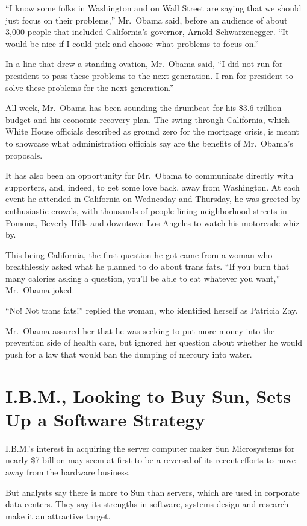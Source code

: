 \documentclass[12pt,a4paper,onecolumn]{article}
\begin{document}
\begin{CJK*}{GBK}{song}
``I know some folks in Washington and on Wall Street are saying that we should just focus on their
problems,'' Mr.~Obama said, before an audience of about 3,000 people that included California's
governor, Arnold Schwarzenegger. ``It would be nice if I could pick and choose what problems to
focus on.''

In a line that drew a standing ovation, Mr.~Obama said, ``I did not run for president to pass these
problems to the next generation. I ran for president to solve these problems for the next
generation.''

All week, Mr.~Obama has been sounding the drumbeat for his \$3.6 trillion budget and his economic
recovery plan. The swing through California, which White House officials described as ground zero
for the mortgage crisis, is meant to showcase what administration officials say are the benefits of
Mr.~Obama's proposals.

It has also been an opportunity for Mr.~Obama to communicate directly with supporters, and, indeed,
to get some love back, away from Washington. At each event he attended in California on Wednesday
and Thursday, he was greeted by enthusiastic crowds, with thousands of people lining neighborhood
streets in Pomona, Beverly Hills and downtown Los Angeles to watch his motorcade whiz by.

This being California, the first question he got came from a woman who breathlessly asked what he
planned to do about trans fats. ``If you burn that many calories asking a question, you'll be able
to eat whatever you want,'' Mr.~Obama joked.

``No! Not trans fats!'' replied the woman, who identified herself as Patricia Zay.

Mr.~Obama assured her that he was seeking to put more money into the prevention side of health care,
but ignored her question about whether he would push for a law that would ban the dumping of mercury
into water.


\section{I.B.M., Looking to Buy Sun, Sets Up a Software Strategy}

I.B.M.'s interest in acquiring the server computer maker Sun Microsystems for nearly \$7 billion may
seem at first to be a reversal of its recent efforts to move away from the hardware business.

But analysts say there is more to Sun than servers, which are used in corporate data centers. They
say its strengths in software, systems design and research make it an attractive target.


\end{CJK*}
\end{document}
